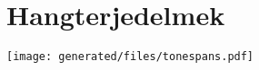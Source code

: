 \documentclass[a4paper,12pt,twoside]{article}
\begin{document}

\setcounter{tocdepth}{3}
\setcounter{secnumdepth}{2}       

\pagestyle{empty} 






\pagestyle{fancy}

\fancyfoot[C]{}

\setcounter{page}{1} %
\resetheaders



\newpage

{
\resetheaders
}
\normalsize

\cleardoublepage
\section*{Hangterjedelmek}
\texttt{[image: generated/files/tonespans.pdf]}
\begin{multicols}{2}

\end{multicols}

\cleardoublepage


%

%

\cleardoublepage
\printindex
\newpage

\pagestyle{empty} 
\end{document}
